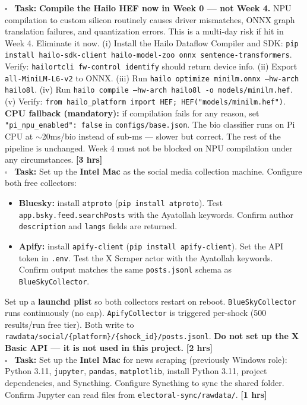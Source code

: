 \documentclass[11pt]{article}
\newcommand{\hrs}[1]{\textbf{[#1 hrs]}}
\newcommand{\task}[2]{%
  \noindent\textbf{Task:} #1 \hfill \hrs{#2}\\}
\newcommand{\done}{\textcolor{sectionblue}{$\square$}\ }
\begin{document}
\begin{taskbox}
\done \task{\textbf{Compile the Hailo HEF now in Week 0 --- not Week 4.}
  NPU compilation to custom silicon routinely causes driver mismatches,
  ONNX graph translation failures, and quantization errors. This is a
  multi-day risk if hit in Week 4. Eliminate it now.
  (i) Install the Hailo Dataflow Compiler and SDK:
  \texttt{pip install hailo-sdk-client hailo-model-zoo onnx sentence-transformers}.
  Verify: \texttt{hailortcli fw-control identify} should return device info.
  (ii) Export \texttt{all-MiniLM-L6-v2} to ONNX.
  (iii) Run \texttt{hailo optimize minilm.onnx --hw-arch hailo8l}.
  (iv) Run \texttt{hailo compile --hw-arch hailo8l -o models/minilm.hef}.
  (v) Verify: \texttt{from hailo\_platform import HEF; HEF("models/minilm.hef")}.
  \textbf{CPU fallback (mandatory):} if compilation fails for any reason,
  set \texttt{"pi\_npu\_enabled": false} in \texttt{configs/base.json}.
  The bio classifier runs on Pi CPU at $\sim$20ms/bio instead of sub-ms ---
  slower but correct. The rest of the pipeline is unchanged.
  Week 4 must not be blocked on NPU compilation under any circumstances.}{3}

\done \task{Set up the \textbf{Intel Mac} as the social media collection machine.
  Configure both free collectors:
  \begin{itemize}[leftmargin=1.6em, itemsep=1pt]
    \item \textbf{Bluesky:} install \texttt{atproto} (\texttt{pip install atproto}).
          Test \texttt{app.bsky.feed.searchPosts} with the Ayatollah keywords.
          Confirm author \texttt{description} and \texttt{langs} fields are returned.
    \item \textbf{Apify:} install \texttt{apify-client} (\texttt{pip install
          apify-client}). Set the API token in \texttt{.env}. Test the X Scraper
          actor with the Ayatollah keywords. Confirm output matches the same
          \texttt{posts.jsonl} schema as \texttt{BlueSkyCollector}.
  \end{itemize}
  Set up a \textbf{launchd plist} so both collectors restart on reboot.
  \texttt{BlueSkyCollector} runs continuously (no cap).
  \texttt{ApifyCollector} is triggered per-shock (500 results/run free tier).
  Both write to \texttt{rawdata/social/\{platform\}/\{shock\_id\}/posts.jsonl}.
  \textbf{Do not set up the X Basic API --- it is not used in this project.}}{2}

\done \task{Set up the \textbf{Intel Mac} for news scraping (previously Windows role):
  Python 3.11, \texttt{jupyter}, \texttt{pandas}, \texttt{matplotlib},
  install Python 3.11, project dependencies, and Syncthing. Configure Syncthing to sync
  the shared folder. Confirm Jupyter can read files from
  \texttt{electoral-sync/rawdata/}.}{1}
\end{taskbox}
\end{document}
